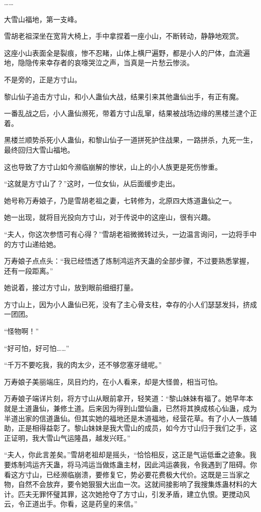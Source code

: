 \begin{this_body}
……

大雪山福地，第一支峰。

雪胡老祖深坐在宽背大椅上，手中拿捏着一座小山，不断转动，静静地观赏。

这座小山表面全是裂痕，惨不忍睹，山体上横尸遍野，都是小人的尸体，血流遍地，隐隐传来幸存者的哀嚎哭泣之声，当真是一片愁云惨淡。

不是旁的，正是方寸山。

黎山仙子追击方寸山，和小人蛊仙大战，结果引来其他蛊仙出手，有正有魔。

一番乱战之后，小人蛊仙濒死，带着方寸山乱窜，结果被战场边缘的黑楼兰逮个正着。

黑楼兰顺势杀死小人蛊仙，和黎山仙子一道拼死护住战果，一路拼杀，九死一生，最终回归大雪山福地。

这也导致了方寸山如今濒临崩解的惨状，山上的小人族更是死伤惨重。

“这就是方寸山了？”这时，一位女仙，从后面缓步走出。

她号称万寿娘子，乃是雪胡老祖之妻，七转修为，北原四大炼道蛊仙之一。

她一出现，就将目光投向方寸山，对于传说中的这座山，很有兴趣。

“夫人，你这次参悟可有心得？”雪胡老祖微微转过头，一边温言询问，一边将手中的方寸山递给她。

万寿娘子点点头：“我已经悟透了炼制鸿运齐天蛊的全部步骤，不过要熟悉掌握，还有一段距离。”

她说着，接过方寸山，放到眼前细细打量。

方寸山上，因为小人蛊仙已死，没有了主心骨支柱，幸存的小人们瑟瑟发抖，挤成一团团。

“怪物啊！”

“好可怕，好可怕……”

“千万不要吃我，我的肉太少，还不够您塞牙缝呢。”

万寿娘子美丽端庄，凤目灼灼，在小人看来，却是大怪兽，相当可怕。

万寿娘子端详片刻，将方寸山从眼前拿开，轻笑道：“黎山妹妹有福了。她早年本就是土道蛊仙，兼修土道。后来因为得到山盟仙蛊，已然将其换成核心仙蛊，成为半道出家的信道蛊仙。但其实她的福地还是木道福地，经营花草。有了小人一族辅助，正是相得益彰了。黎山妹妹是我大雪山的成员，如今方寸山归于我们之手，这正证明，我大雪山气运隆昌，越发兴旺。”

“夫人，你此言差矣。”雪胡老祖却是摇头，“恰恰相反，这正是气运低垂之迹象。我要炼制鸿运齐天蛊，将马鸿运当做炼蛊主材，因此鸿运袭我，令我遇到了阻碍。你看这方寸山，已经濒临崩溃，要修复它，势必要花费极大代价。这既是三当家之物，自然不会放弃，要令她狠狠大出血一次。这就间接影响了我搜集炼蛊材料的大计。匹夫无罪怀璧其罪，这次她抢夺了方寸山，引发矛盾，建立仇恨。更搅动风云，令正道出手。你看，这是药皇的来信。”


\end{this_body}

